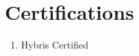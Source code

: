 \section*{Certifications}
\begin{enumerate}[label=,leftmargin=0cm,itemsep=10pt]
\item Hybris Certified
\end{enumerate}